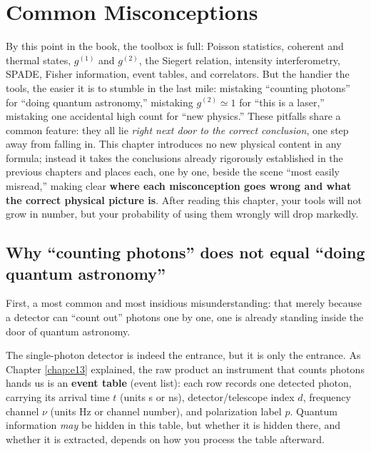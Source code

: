 \chapter{Common Misconceptions}
\label{chap:e27}

\begin{chapteropening}
By this point in the book, the toolbox is full: Poisson statistics, coherent and thermal states, \(g^{(1)}\) and \(g^{(2)}\), the Siegert relation, intensity interferometry, SPADE, Fisher information, event tables, and correlators. But the handier the tools, the easier it is to stumble in the last mile: mistaking ``counting photons'' for ``doing quantum astronomy,'' mistaking \(g^{(2)}\simeq1\) for ``this is a laser,'' mistaking one accidental high count for ``new physics.'' These pitfalls share a common feature: they all lie \emph{right next door to the correct conclusion}, one step away from falling in. This chapter introduces no new physical content in any formula; instead it takes the conclusions already rigorously established in the previous chapters and places each, one by one, beside the scene ``most easily misread,'' making clear \textbf{where each misconception goes wrong and what the correct physical picture is}. After reading this chapter, your tools will not grow in number, but your probability of using them wrongly will drop markedly.
\end{chapteropening}


\section{Why ``counting photons'' does not equal ``doing quantum astronomy''}
\label{sec:e27-photon-not-quantum}

First, a most common and most insidious misunderstanding: that merely because a detector can ``count out'' photons one by one, one is already standing inside the door of quantum astronomy.

The single-photon detector is indeed the entrance, but it is only the entrance. As Chapter \ref{chap:e13} explained, the raw product an instrument that counts photons hands us is an \textbf{event table} (event list): each row records one detected photon, carrying its arrival time \(t\) (units s or ns), detector/telescope index \(d\), frequency channel \(\nu\) (units Hz or channel number), and polarization label \(p\). Quantum information \emph{may} be hidden in this table, but whether it is hidden there, and whether it is extracted, depends on how you process the table afterward.

